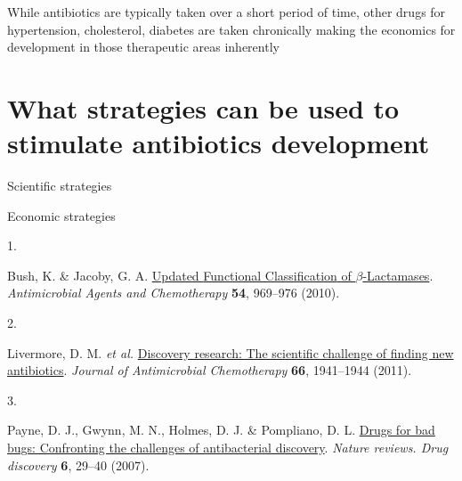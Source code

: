 \documentclass[
]{book}
\newlength{\cslhangindent}
\newlength{\csllabelwidth}
\newlength{\cslentryspacingunit} %
\newenvironment{CSLReferences}[2] %
 {%
  \setlength{\parindent}{0pt}
  \ifodd #1
  \let\oldpar\par
  \def\par{\hangindent=\cslhangindent\oldpar}
  \fi
  \setlength{\parskip}{#2\cslentryspacingunit}
 }%
 {}
\newcommand{\CSLLeftMargin}[1]{\parbox[t]{\csllabelwidth}{#1}}
\newcommand{\CSLRightInline}[1]{\parbox[t]{\linewidth - \csllabelwidth}{#1}\break}
\begin{document}
While antibiotics are typically taken over a short period of time, other drugs for hypertension, cholesterol, diabetes are taken chronically making the economics for development in those therapeutic areas inherently

\hypertarget{what-strategies-can-be-used-to-stimulate-antibiotics-development}{%
\section*{What strategies can be used to stimulate antibiotics development}\label{what-strategies-can-be-used-to-stimulate-antibiotics-development}}

Scientific strategies

Economic strategies

\hypertarget{refs}{}
\begin{CSLReferences}{0}{0}
\leavevmode{}%
\CSLLeftMargin{1. }
\CSLRightInline{Bush, K. \& Jacoby, G. A. \href{https://doi.org/10.1128/AAC.01009-09}{Updated {Functional Classification} of {\(\beta\)}-{Lactamases}}. \emph{Antimicrobial Agents and Chemotherapy} \textbf{54}, 969--976 (2010).}

\leavevmode{}%
\CSLLeftMargin{2. }
\CSLRightInline{Livermore, D. M. \emph{et al.} \href{https://doi.org/10.1093/jac/dkr262}{Discovery research: The scientific challenge of finding new antibiotics}. \emph{Journal of Antimicrobial Chemotherapy} \textbf{66}, 1941--1944 (2011).}

\leavevmode{}%
\CSLLeftMargin{3. }
\CSLRightInline{Payne, D. J., Gwynn, M. N., Holmes, D. J. \& Pompliano, D. L. \href{https://doi.org/10.1038/nrd2201}{Drugs for bad bugs: Confronting the challenges of antibacterial discovery}. \emph{Nature reviews. Drug discovery} \textbf{6}, 29--40 (2007).}

\end{CSLReferences}
\end{document}
